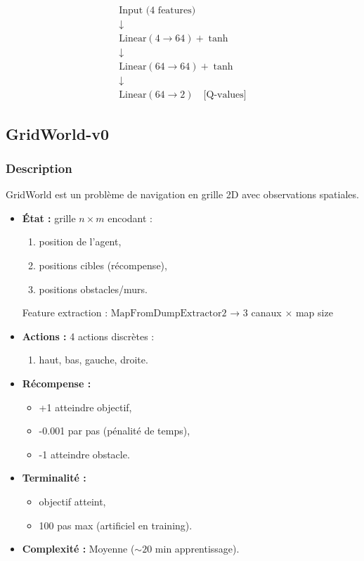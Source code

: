 \documentclass[12pt,a4paper]{article}
\begin{document}
\[
\begin{array}{c}
\text{Input (4 features)} \\
\downarrow \\
\text{Linear}(4 \to 64) + \tanh \\
\downarrow \\
\text{Linear}(64 \to 64) + \tanh \\
\downarrow \\
\text{Linear}(64 \to 2) \quad \text{[Q-values]}
\end{array}
\]

\subsection{GridWorld-v0}

\subsubsection{Description}

GridWorld est un problème de navigation en grille 2D avec observations spatiales.

\begin{itemize}
    \item \textbf{État :} grille $n \times m$ encodant :
    \begin{enumerate}
        \item position de l'agent,
        \item positions cibles (récompense),
        \item positions obstacles/murs.
    \end{enumerate}
    Feature extraction : $\text{MapFromDumpExtractor2}$ → 3 canaux $\times$ map size

    \item \textbf{Actions :} 4 actions discrètes :
    \begin{enumerate}
        \item haut, bas, gauche, droite.
    \end{enumerate}

    \item \textbf{Récompense :}
    \begin{itemize}
        \item +1 atteindre objectif,
        \item -0.001 par pas (pénalité de temps),
        \item -1 atteindre obstacle.
    \end{itemize}

    \item \textbf{Terminalité :}
    \begin{itemize}
        \item objectif atteint,
        \item 100 pas max (artificiel en training).
    \end{itemize}

    \item \textbf{Complexité :} Moyenne ($\sim 20$ min apprentissage).
\end{itemize}
\end{document}
